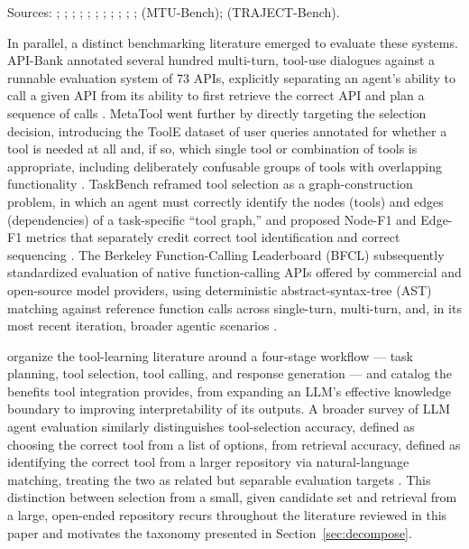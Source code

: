\documentclass[acmsmall]{acmart}
\begin{document}
\begin{table}[!t]
  \par\smallskip
  \footnotesize Sources: \citet{schick2023toolformer}; \citet{yao2023react}; \citet{patil2023gorilla}; \citet{li2023apibank}; \citet{shen2023hugginggpt}; \citet{qin2024toolllm}; \citet{huang2024metatool}; \citet{shen2023taskbench}; \citet{patil2025bfcl}; \citet{shi2025toolretrieval}; \citet{qian2025toolrl}; \citet{wang2024mtubench} (MTU-Bench); \citet{he2025trajectbench} (TRAJECT-Bench).
\end{table}

In parallel, a distinct benchmarking literature emerged to evaluate these systems. API-Bank annotated several hundred multi-turn, tool-use dialogues against a runnable evaluation system of 73 APIs, explicitly separating an agent's ability to call a given API from its ability to first retrieve the correct API and plan a sequence of calls \citep{li2023apibank}. MetaTool went further by directly targeting the selection decision, introducing the ToolE dataset of user queries annotated for whether a tool is needed at all and, if so, which single tool or combination of tools is appropriate, including deliberately confusable groups of tools with overlapping functionality \citep{huang2024metatool}. TaskBench reframed tool selection as a graph-construction problem, in which an agent must correctly identify the nodes (tools) and edges (dependencies) of a task-specific ``tool graph,'' and proposed Node-F1 and Edge-F1 metrics that separately credit correct tool identification and correct sequencing \citep{shen2023taskbench}. The Berkeley Function-Calling Leaderboard (BFCL) subsequently standardized evaluation of native function-calling APIs offered by commercial and open-source model providers, using deterministic abstract-syntax-tree (AST) matching against reference function calls across single-turn, multi-turn, and, in its most recent iteration, broader agentic scenarios \citep{patil2025bfcl}.

\citet{qu2025survey} organize the tool-learning literature around a four-stage workflow --- task planning, tool selection, tool calling, and response generation --- and catalog the benefits tool integration provides, from expanding an LLM's effective knowledge boundary to improving interpretability of its outputs. A broader survey of LLM agent evaluation similarly distinguishes tool-selection accuracy, defined as choosing the correct tool from a list of options, from retrieval accuracy, defined as identifying the correct tool from a larger repository via natural-language matching, treating the two as related but separable evaluation targets \citep{mohammadi2025evaluation}. This distinction between selection from a small, given candidate set and retrieval from a large, open-ended repository recurs throughout the literature reviewed in this paper and motivates the taxonomy presented in Section~\ref{sec:decompose}.
\end{document}
